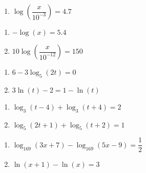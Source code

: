 \documentclass{ximera}
\begin{document}
\begin{enumerate}

\item $\log\left(\dfrac{x}{10^{-3}}\right) = 4.7$  \label{sixfourRichterequ}


\setcounter{HW}{\value{enumi}}
\end{enumerate}


\begin{enumerate}
\setcounter{enumi}{\value{HW}}

\item $-\log(x) = 5.4$  \label{sixfourpHequ}
\item $10\log\left(\dfrac{x}{10^{-12}}\right) = 150$ \label{sixfourdecibelequ}

\setcounter{HW}{\value{enumi}}
\end{enumerate}

\begin{enumerate}
\setcounter{enumi}{\value{HW}}

\item $6-3\log_{5}(2t)=0$
\item $3\ln(t)-2=1-\ln(t)$

\setcounter{HW}{\value{enumi}}
\end{enumerate}

\begin{enumerate}
\setcounter{enumi}{\value{HW}}

\item $\log_{3}(t - 4) + \log_{3}(t + 4) = 2$

\item $\log_{5}(2t + 1) + \log_{5}(t + 2) = 1$

\setcounter{HW}{\value{enumi}}
\end{enumerate}

\begin{enumerate}
\setcounter{enumi}{\value{HW}}

\item $\log_{169}(3x + 7) - \log_{169}(5x - 9) = \dfrac{1}{2}$

\item $\ln(x+1) - \ln(x) = 3$ 

\setcounter{HW}{\value{enumi}}
\end{enumerate}
\end{document}
